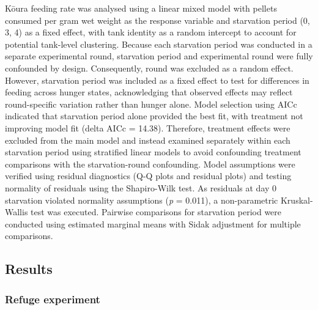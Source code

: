 \documentclass[
  letterpaper,
  DIV=11,
  numbers=noendperiod]{scrartcl}
\begin{document}
Kōura feeding rate was analysed using a linear mixed model with pellets
consumed per gram wet weight as the response variable and starvation
period (0, 3, 4) as a fixed effect, with tank identity as a random
intercept to account for potential tank-level clustering. Because each
starvation period was conducted in a separate experimental round,
starvation period and experimental round were fully confounded by
design. Consequently, round was excluded as a random effect. However,
starvation period was included as a fixed effect to test for differences
in feeding across hunger states, acknowledging that observed effects may
reflect round-specific variation rather than hunger alone. Model
selection using AICc indicated that starvation period alone provided the
best fit, with treatment not improving model fit (delta AICc = 14.38).
Therefore, treatment effects were excluded from the main model and
instead examined separately within each starvation period using
stratified linear models to avoid confounding treatment comparisons with
the starvation-round confounding. Model assumptions were verified using
residual diagnostics (Q-Q plots and residual plots) and testing
normality of residuals using the Shapiro-Wilk test. As residuals at day
0 starvation violated normality assumptions (\emph{p} = 0.011), a
non-parametric Kruskal-Wallis test was executed. Pairwise comparisons
for starvation period were conducted using estimated marginal means with
Sidak adjustment for multiple comparisons.

\subsection{Results}\label{results}

\subsubsection{Refuge experiment}\label{refuge-experiment-1}
\end{document}
